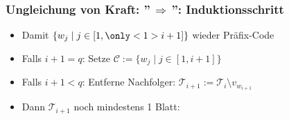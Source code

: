 \documentclass{beamer}
\begin{document}
\begin{frame}[t]
    \frametitle{Ungleichung von Kraft: ''$\,\Longrightarrow\,$'': Induktionsschritt}
    \begin{itemize}
        \setlength\itemsep{1em}
        \item Damit $\{w_j \mid j \in [1,{\only<1>{\color{blue}}i+1}]\}$ wieder Präfix-Code
        \item Falls $i+1 = q$: Setze $\mathcal{C} := \{w_j \mid j \in [1,i+1]\}$
        \pause
        \item Falls $i+1 < q$: Entferne Nachfolger: $\mathcal{T}_{i+1} := \mathcal{T}_i \setminus v_{w_{i+1}}$
        \pause
        \item Dann $\mathcal{T}_{i+1}$ noch mindestens 1 Blatt:
    \end{itemize}
    \strut
\end{frame}
\end{document}
